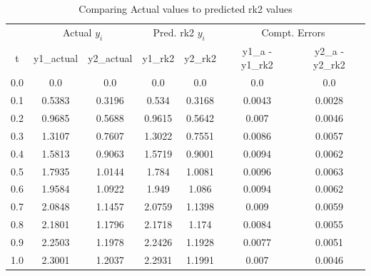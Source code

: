 \documentclass[12pt,oneside]{book}
\begin{document}
		\begin{table}[h!]
			\caption{Comparing Actual values to predicted \ac{rk2} values}
			\begin{tabular}{ccccccc}
				\toprule
				& \multicolumn{2}{c}{Actual $ y_{i} $} & \multicolumn{2}{c}{Pred. \ac{rk2} $ y_{i} $ } & \multicolumn{2}{c}{Compt. Errors} \\
				t & y1\_actual & y2\_actual & y1\_rk2 & y2\_rk2 & y1\_a - y1\_rk2 & y2\_a - y2\_rk2 \\ \midrule
				0.0 & 0.0 & 0.0 & 0.0 & 0.0 & 0.0 & 0.0 \\
				0.1 & 0.5383 & 0.3196 & 0.534 & 0.3168 & 0.0043 & 0.0028 \\
				0.2 & 0.9685 & 0.5688 & 0.9615 & 0.5642 & 0.007 & 0.0046 \\
				0.3 & 1.3107 & 0.7607 & 1.3022 & 0.7551 & 0.0086 & 0.0057 \\
				0.4 & 1.5813 & 0.9063 & 1.5719 & 0.9001 & 0.0094 & 0.0062 \\
				0.5 & 1.7935 & 1.0144 & 1.784 & 1.0081 & 0.0096 & 0.0063 \\
				0.6 & 1.9584 & 1.0922 & 1.949 & 1.086 & 0.0094 & 0.0062 \\
				0.7 & 2.0848 & 1.1457 & 2.0759 & 1.1398 & 0.009 & 0.0059 \\
				0.8 & 2.1801 & 1.1796 & 2.1718 & 1.174 & 0.0084 & 0.0055 \\
				0.9 & 2.2503 & 1.1978 & 2.2426 & 1.1928 & 0.0077 & 0.0051 \\
				1.0 & 2.3001 & 1.2037 & 2.2931 & 1.1991 & 0.007 & 0.0046 \\
				\bottomrule
			\end{tabular}
		\end{table}
	
\end{document}
